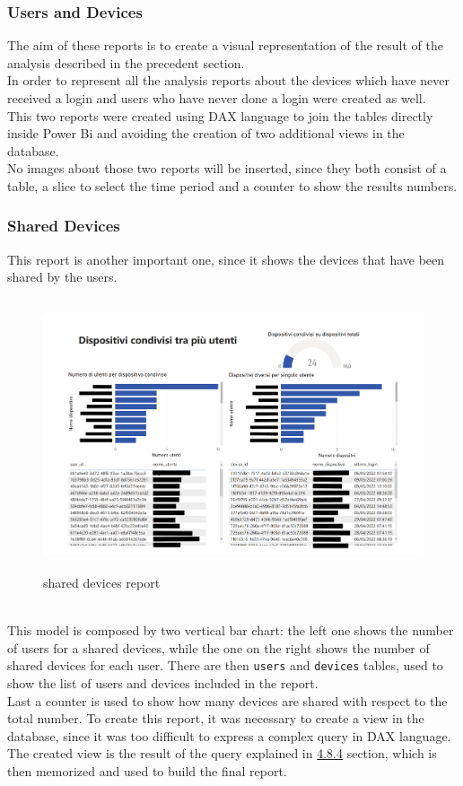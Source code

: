\documentclass[12pt, a4paper, oneside]{article}
\begin{document}
\subsubsection{Users and Devices}
The aim of these reports is to create a visual representation of the result of the analysis described in the precedent section. \\
In order to represent all the analysis reports about the devices which have never received a login and users who have never done a login were created as well.\\
This two reports were created using DAX language to join the tables directly inside Power Bi and avoiding the creation of two additional views in the database.\\
No images about those two reports will be inserted, since they both consist of a table, a slice to select the time period and a counter to show the results numbers.

\subsubsection{Shared Devices}
This report is another important one, since it shows the devices that have been shared by the users.
\begin{figure}[h]
    \centering
    \includegraphics[width=\textwidth, height=8cm]{shared-devices.png}
    \caption{shared devices report}
\end{figure}\\
This model is composed by two vertical bar chart: the left one shows the number of users for a shared devices, while the one on the right shows the number of shared devices for each user.
There are then \texttt{users} and \texttt{devices} tables, used to show the list of users and devices included in the report. \\
Last a counter is used to show how many devices are shared with respect to the total number.
To create this report, it was necessary to create a view in the database, since it was too difficult to express a complex query in DAX language. The created view is the result of the query explained in 
\hyperref[subsubsec:shared]{4.8.4} section, which is then memorized and used to build the final report.
\end{document}
